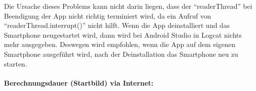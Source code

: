 \documentclass[12pt, onecolumn, notitlepage]{scrartcl}
\begin{document}
Die Ursache dieses Problems kann nicht darin liegen, dass der \enquote{readerThread} bei Beendigung der App nicht richtig terminiert wird, da ein Aufruf von \enquote{readerThread.interrupt()} nicht hilft. Wenn die App deinstalliert und das Smartphone neugestartet wird, dann wird bei Android Studio in Logcat nichts mehr ausgegeben. Deswegen wird empfohlen, wenn die App auf dem eigenen Smartphone ausgeführt wird, nach der Deinstallation das Smartphone neu zu starten. \\ \\
\textbf{Berechnungsdauer (Startbild) via Internet:}
\begin{table}[H] 
	\centering
\end{table}
\end{document}
